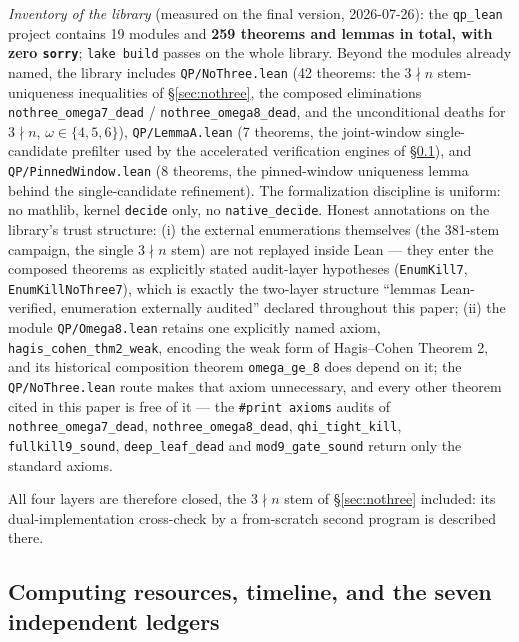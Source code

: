 \documentclass[11pt]{article}
\theoremstyle{remark}
\begin{document}
\begin{enumerate}
\emph{Inventory of the library} (measured on the final version, 2026-07-26): the \texttt{qp\_lean} project contains 19 modules and \textbf{259 theorems and lemmas in total, with zero \texttt{sorry}}; \texttt{lake build} passes on the whole library. Beyond the modules already named, the library includes \texttt{QP/NoThree.lean} (42 theorems: the $3 \nmid n$ stem-uniqueness inequalities of \S\ref{sec:nothree}, the composed eliminations \texttt{nothree\_omega7\_dead} / \texttt{nothree\_omega8\_dead}, and the unconditional deaths for $3 \nmid n$, $\omega \in \{4,5,6\}$), \texttt{QP/LemmaA.lean} (7 theorems, the joint-window single-candidate prefilter used by the accelerated verification engines of \S\ref{sec:ledgers}), and \texttt{QP/PinnedWindow.lean} (8 theorems, the pinned-window uniqueness lemma behind the single-candidate refinement). The formalization discipline is uniform: no mathlib, kernel \texttt{decide} only, no \texttt{native\_decide}. Honest annotations on the library's trust structure: (i) the external enumerations themselves (the 381-stem campaign, the single $3 \nmid n$ stem) are not replayed inside Lean --- they enter the composed theorems as explicitly stated audit-layer hypotheses (\texttt{EnumKill7}, \texttt{EnumKillNoThree7}), which is exactly the two-layer structure ``lemmas Lean-verified, enumeration externally audited'' declared throughout this paper; (ii) the module \texttt{QP/Omega8.lean} retains one explicitly named axiom, \texttt{hagis\_cohen\_thm2\_weak}, encoding the weak form of Hagis--Cohen Theorem 2, and its historical composition theorem \texttt{omega\_ge\_8} does depend on it; the \texttt{QP/NoThree.lean} route makes that axiom unnecessary, and every other theorem cited in this paper is free of it --- the \texttt{\#print axioms} audits of \texttt{nothree\_omega7\_dead}, \texttt{nothree\_omega8\_dead}, \texttt{qhi\_tight\_kill}, \texttt{fullkill9\_sound}, \texttt{deep\_leaf\_dead} and \texttt{mod9\_gate\_sound} return only the standard axioms.

All four layers are therefore closed, the $3 \nmid n$ stem of \S\ref{sec:nothree} included: its dual-implementation cross-check by a from-scratch second program is described there.
\end{enumerate}

\subsection{Computing resources, timeline, and the seven independent ledgers}\label{sec:ledgers}
\end{document}
